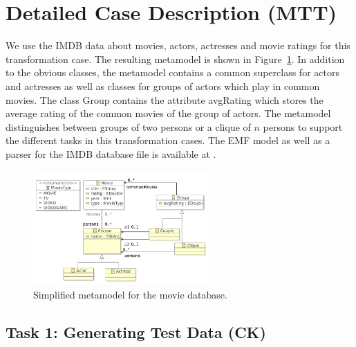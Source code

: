 \documentclass[a4paper,11pt]{article}
\newcommand{\p}[1]{\textsf{\small #1}}
\begin{document}
\section{Detailed Case Description (MTT)}\label{sec-case}

We use the IMDB data about movies, actors, actresses and movie ratings for
this transformation case. The resulting metamodel is shown in
Figure~\ref{fig:metamodel}. In addition to the obvious classes, the
metamodel contains a common superclass for actors and actresses as
well as classes for groups of actors which play in common movies. The
class \p{Group} contains the attribute \p{avgRating} which stores the
average rating of the common movies of the group of actors. The
metamodel distinguishes between groups of two persons or a clique of
$n$ persons to support the different tasks in this transformation
cases.  The EMF model as well as a parser for the IMDB database file
is available at \cite{IMDB2EMF}.

\begin{figure}[ht]
\centering
\includegraphics[width=0.6\textwidth]{movies}
\caption{Simplified metamodel for the movie database.}
\label{fig:metamodel}
\end{figure}

\subsection{Task 1: Generating Test Data (CK)}
\label{sec:gen-test-data}

\end{document}
